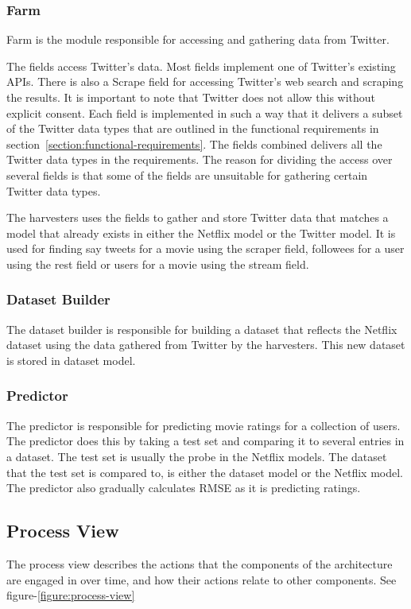 \subsubsection{Farm}
Farm is the module responsible for accessing and gathering data from Twitter.

The fields access Twitter's data. Most fields implement one of Twitter's existing APIs. There is also a Scrape field for accessing Twitter's web search and scraping the results. It is important to note that Twitter does not allow this without explicit consent. Each field is implemented in such a way that it delivers a subset of the Twitter data types that are outlined in the functional requirements in section~\ref{section:functional-requirements}. The fields combined delivers all the Twitter data types in the requirements. The reason for dividing the access over several fields is that some of the fields are unsuitable for gathering certain Twitter data types.

The harvesters uses the fields to gather and store Twitter data that matches a model that already exists in either the Netflix model or the Twitter model. It is used for finding say tweets for a movie using the scraper field, followees for a user using the rest field or users for a movie using the stream field.

\subsubsection{Dataset Builder}
The dataset builder is responsible for building a dataset that reflects the Netflix dataset using the data gathered from Twitter by the harvesters. This new dataset is stored in dataset model.

\subsubsection{Predictor}
The predictor is responsible for predicting movie ratings for a collection of users. The predictor does this by taking a test set and comparing it to several entries in a dataset. The test set is usually the probe in the Netflix models. The dataset that the test set is compared to, is either the dataset model or the Netflix model. The predictor also gradually calculates RMSE as it is predicting ratings.

\subsection{Process View}
The process view describes the actions that the components of the architecture are engaged in over time, and how their actions relate to other components. See figure-\ref{figure:process-view}

